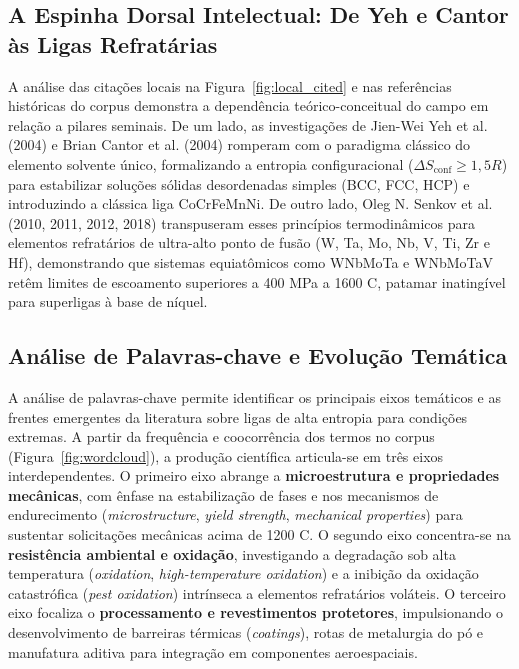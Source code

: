 \subsection{A Espinha Dorsal Intelectual: De Yeh e Cantor às Ligas Refratárias}\label{a-espinha-dorsal-intelectual-de-yeh-e-cantor-as-ligas-refratarias}

A análise das citações locais na Figura~\ref{fig:local_cited} e nas referências históricas do corpus demonstra a dependência teórico-conceitual do campo em relação a pilares seminais. De um lado, as investigações de Jien-Wei Yeh et al. (2004) e Brian Cantor et al. (2004) romperam com o paradigma clássico do elemento solvente único, formalizando a entropia configuracional ($\Delta S_{\text{conf}} \ge 1{,}5R$) para estabilizar soluções sólidas desordenadas simples (BCC, FCC, HCP) e introduzindo a clássica liga CoCrFeMnNi. De outro lado, Oleg N. Senkov et al. (2010, 2011, 2012, 2018) transpuseram esses princípios termodinâmicos para elementos refratários de ultra-alto ponto de fusão (W, Ta, Mo, Nb, V, Ti, Zr e Hf), demonstrando que sistemas equiatômicos como WNbMoTa e WNbMoTaV retêm limites de escoamento superiores a 400 MPa a 1600 \textdegree{}C, patamar inatingível para superligas à base de níquel.

\subsection{Análise de Palavras-chave e Evolução Temática}\label{sec:analise_palavras_chave}

A análise de palavras-chave permite identificar os principais eixos temáticos e as frentes emergentes da literatura sobre ligas de alta entropia para condições extremas. A partir da frequência e coocorrência dos termos no corpus (Figura~\ref{fig:wordcloud}), a produção científica articula-se em três eixos interdependentes. O primeiro eixo abrange a \textbf{microestrutura e propriedades mecânicas}, com ênfase na estabilização de fases e nos mecanismos de endurecimento (\emph{microstructure}, \emph{yield strength}, \emph{mechanical properties}) para sustentar solicitações mecânicas acima de 1200 \textdegree{}C. O segundo eixo concentra-se na \textbf{resistência ambiental e oxidação}, investigando a degradação sob alta temperatura (\emph{oxidation}, \emph{high-temperature oxidation}) e a inibição da oxidação catastrófica (\emph{pest oxidation}) intrínseca a elementos refratários voláteis. O terceiro eixo focaliza o \textbf{processamento e revestimentos protetores}, impulsionando o desenvolvimento de barreiras térmicas (\emph{coatings}), rotas de metalurgia do pó e manufatura aditiva para integração em componentes aeroespaciais.

